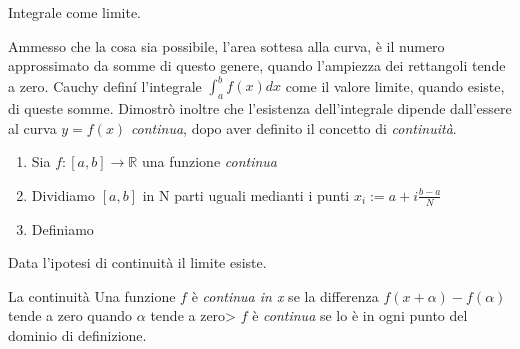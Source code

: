 \begin{frame}
  \begin{block}{Integrale come limite.}

    \alert{Ammesso che la cosa sia possibile}, l'area sottesa alla curva,
    è il numero approssimato da somme di questo genere, quando l'ampiezza dei rettangoli
    tende a zero. 
    Cauchy definí l'integrale $\int_{a}^bf(x)dx$ come il valore limite, quando esiste,
    di queste somme.
    Dimostrò inoltre che l'esistenza dell'integrale dipende dall'essere al curva $y=f(x)$ \textit{continua},
    dopo aver definito il concetto di \textit{continuità}.


  \begin{enumerate}
    \item Sia $f: [a,b] \rightarrow \mathbb{R}$ una funzione \textit{continua}
    \item Dividiamo $[a,b]$ in N parti uguali medianti i punti $x_i := a + i\frac{b-a}{N}$ 
    \item Definiamo 
  \end{enumerate}

  Data l'ipotesi di continuità il limite esiste.
  \end{block}

  \begin{block}{La continuità}
    Una funzione $f$ è \textit{continua in x} se la differenza $f(x+\alpha) - f(\alpha)$ 
    tende a zero quando $\alpha$ tende a zero> $f$ è \textit{continua} se lo è in ogni
    punto del dominio di definizione.
  \end{block}


\end{frame}


